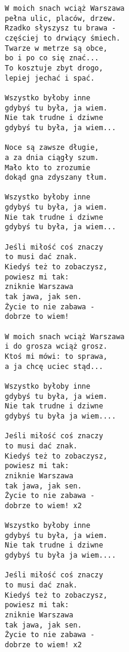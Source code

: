 \documentclass[12pt]{article}
\begin{document}
\begin{multicols}{2}
\begin{verbatim}
W moich snach wciąż Warszawa
pełna ulic, placów, drzew.
Rzadko słyszysz tu brawa -
częściej to drwiący śmiech.
Twarze w metrze są obce,
bo i po co się znać...
To kosztuje zbyt drogo,
lepiej jechać i spać.

Wszystko byłoby inne
gdybyś tu była, ja wiem.
Nie tak trudne i dziwne
gdybyś tu była, ja wiem...

Noce są zawsze długie,
a za dnia ciągły szum.
Mało kto to zrozumie
dokąd gna zdyszany tłum.

Wszystko byłoby inne
gdybyś tu była, ja wiem.
Nie tak trudne i dziwne
gdybyś tu była, ja wiem...

Jeśli miłość coś znaczy
to musi dać znak.
Kiedyś też to zobaczysz,
powiesz mi tak:
zniknie Warszawa
tak jawa, jak sen.
Życie to nie zabawa -
dobrze to wiem!

W moich snach wciąż Warszawa
i do grosza wciąż grosz.
Ktoś mi mówi: to sprawa,
a ja chcę uciec stąd...

Wszystko byłoby inne
gdybyś tu była, ja wiem.
Nie tak trudne i dziwne
gdybyś tu była ja wiem....

Jeśli miłość coś znaczy
to musi dać znak.
Kiedyś też to zobaczysz,
powiesz mi tak:
zniknie Warszawa
tak jawa, jak sen.
Życie to nie zabawa -
dobrze to wiem! x2

Wszystko byłoby inne
gdybyś tu była, ja wiem.
Nie tak trudne i dziwne
gdybyś tu była ja wiem....

Jeśli miłość coś znaczy
to musi dać znak.
Kiedyś też to zobaczysz,
powiesz mi tak:
zniknie Warszawa
tak jawa, jak sen.
Życie to nie zabawa -
dobrze to wiem! x2
\end{verbatim}
\end{multicols}
\clearpage
\end{document}
